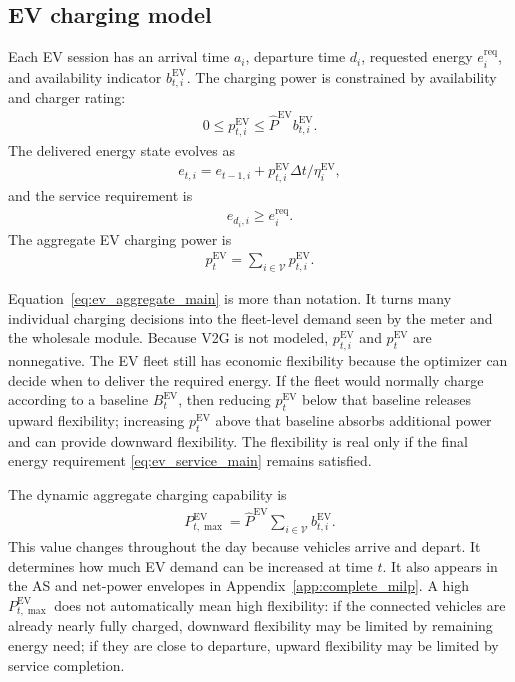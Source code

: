 \documentclass[final,5p,times]{elsarticle}
\newcommand{\DeltaT}{\Delta t}
\newcommand{\EV}{\mathrm{EV}}
\newcommand{\req}{\mathrm{req}}
\newcommand{\calV}{\mathcal{V}}
\begin{document}
\subsection{EV charging model}
Each EV session has an arrival time $a_i$, departure time $d_i$, requested energy $e_i^{\req}$, and availability indicator $b_{t,i}^{\EV}$. The charging power is constrained by availability and charger rating:
\begin{align}
0 \le p_{t,i}^{\EV} \le \hat P^{\EV} b_{t,i}^{\EV}.
\label{eq:ev_power_bound_main}
\end{align}
The delivered energy state evolves as
\begin{align}
e_{t,i}=e_{t-1,i}+p_{t,i}^{\EV}\DeltaT/\eta_i^{\EV},
\label{eq:ev_energy_main}
\end{align}
and the service requirement is
\begin{align}
e_{d_i,i}\ge e_i^{\req}.
\label{eq:ev_service_main}
\end{align}
The aggregate EV charging power is
\begin{align}
p_t^{\EV}=\sum_{i\in\calV} p_{t,i}^{\EV}.
\label{eq:ev_aggregate_main}
\end{align}

Equation~\eqref{eq:ev_aggregate_main} is more than notation. It turns many individual charging decisions into the fleet-level demand seen by the meter and the wholesale module. Because V2G is not modeled, $p_{t,i}^{\EV}$ and $p_t^{\EV}$ are nonnegative. The EV fleet still has economic flexibility because the optimizer can decide when to deliver the required energy. If the fleet would normally charge according to a baseline $B_t^{\EV}$, then reducing $p_t^{\EV}$ below that baseline releases upward flexibility; increasing $p_t^{\EV}$ above that baseline absorbs additional power and can provide downward flexibility. The flexibility is real only if the final energy requirement \eqref{eq:ev_service_main} remains satisfied.

The dynamic aggregate charging capability is
\begin{align}
P_{t,\max}^{\EV}=\hat P^{\EV}\sum_{i\in\calV}b_{t,i}^{\EV}.
\label{eq:ev_capability_main}
\end{align}
This value changes throughout the day because vehicles arrive and depart. It determines how much EV demand can be increased at time $t$. It also appears in the AS and net-power envelopes in Appendix~\ref{app:complete_milp}. A high $P_{t,\max}^{\EV}$ does not automatically mean high flexibility: if the connected vehicles are already nearly fully charged, downward flexibility may be limited by remaining energy need; if they are close to departure, upward flexibility may be limited by service completion.
\end{document}
